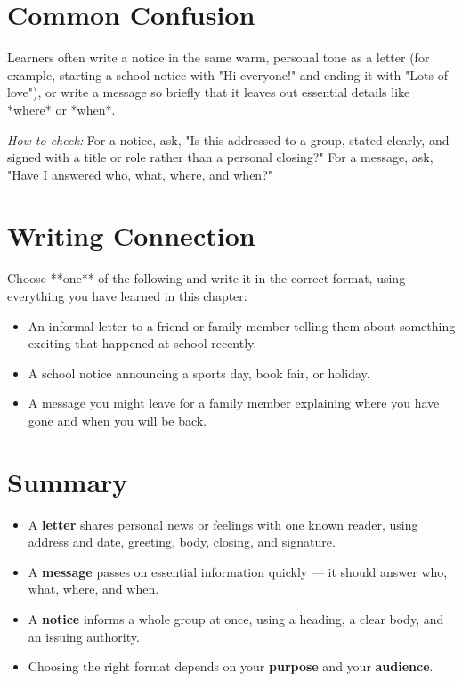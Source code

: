 \section{Common Confusion}
\begin{warningbox}
Learners often write a notice in the same warm, personal tone as a letter (for example, starting a school notice with "Hi everyone!" and ending it with "Lots of love"), or write a message so briefly that it leaves out essential details like *where* or *when*.

\textit{How to check:} For a notice, ask, "Is this addressed to a group, stated clearly, and signed with a title or role rather than a personal closing?" For a message, ask, "Have I answered who, what, where, and when?"
\end{warningbox}

\section{Writing Connection}
Choose **one** of the following and write it in the correct format, using everything you have learned in this chapter:
\begin{itemize}
    \item An informal letter to a friend or family member telling them about something exciting that happened at school recently.
    \item A school notice announcing a sports day, book fair, or holiday.
    \item A message you might leave for a family member explaining where you have gone and when you will be back.
\end{itemize}

\section{Summary}
\begin{summarybox}
\begin{itemize}
    \item A \textbf{letter} shares personal news or feelings with one known reader, using address and date, greeting, body, closing, and signature.
    \item A \textbf{message} passes on essential information quickly — it should answer who, what, where, and when.
    \item A \textbf{notice} informs a whole group at once, using a heading, a clear body, and an issuing authority.
    \item Choosing the right format depends on your \textbf{purpose} and your \textbf{audience}.
\end{itemize}
\end{summarybox}


